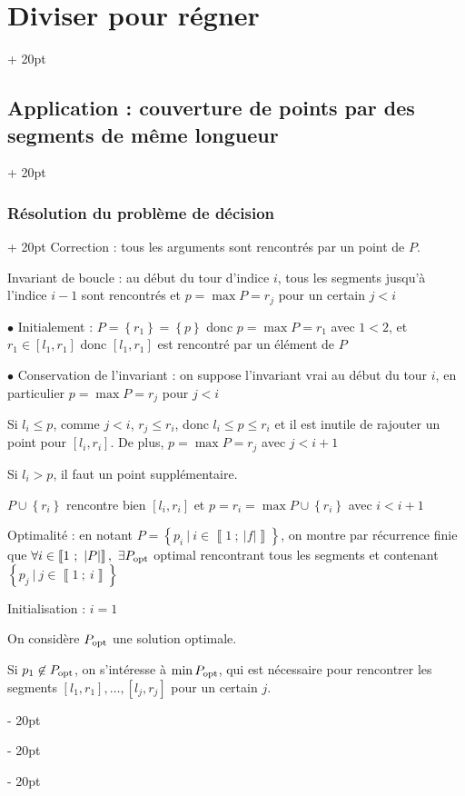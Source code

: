 \documentclass[a4paper, 12pt, twoside]{article}
\newcommand{\nset}[2]{\left\llbracket #1\ ;\ #2 \right\rrbracket}
\newcommand{\set}[1]{\left\{ #1 \right\}}
\newcommand{\abs}[1]{\left\lvert #1 \right\rvert} %
\renewcommand{\le}{\leqslant}
\newcommand{\ind}[1][20pt]{\advance\leftskip + #1}
\newcommand{\deind}[1][20pt]{\advance\leftskip - #1}
\newenvironment{indt}[2][20pt]{#2 \par \ind[#1]}{\par \deind} %
\begin{document}
\begin{indt}{\section{Diviser pour régner}}
\begin{indt}{\subsection{Application : couverture de points par des segments de même longueur}}
\begin{indt}{\subsubsection{Résolution du problème de décision}}
                Correction : tous les arguments sont rencontrés par un point de $P$.
                
                Invariant de boucle : au début du tour d'indice $i$, tous les segments jusqu'à l'indice $i - 1$ sont rencontrés et $p = \max P = r_j$ pour un certain $j < i$
                
                \vspace{12pt}
                
                $\bullet$ Initialement : $P = \set{r_1} = \set p$ donc $p = \max P = r_1$ avec $1 < 2$, et $r_1 \in [l_1, r_1]$ donc $[l_1, r_1]$ est rencontré par un élément de $P$
                
                \vspace{6pt}
                
                $\bullet$ Conservation de l'invariant : on suppose l'invariant vrai au début du tour $i$, en particulier $p = \max P = r_j$ pour $j < i$
                
                Si $l_i \le p$, comme $j < i$, $r_j \le r_i$, donc $l_i \le p \le r_i$ et il est inutile de rajouter un point pour $[l_i, r_i]$. De plus, $p = \max P = r_j$ avec $j < i + 1$
                
                Si $l_i > p$, il faut un point supplémentaire.
                
                $P \cup \set{r_i}$ rencontre bien $[l_i, r_i]$ et $p = r_i = \max P \cup \set{r_i}$ avec $i < i + 1$
                
                \vspace{12pt}
                
                Optimalité : en notant $P = \set{p_i\ |\ i \in \nset{1}{\abs f}}$, on montre par récurrence finie que $\forall i \in \nset{1}{\abs P},\ \exists P_{\rm opt}$ optimal rencontrant tous les segments et contenant $\set{p_j\ |\ j \in \nset 1 i}$
                
                \vspace{6pt}
                
                Initialisation : $i = 1$
                
                On considère $P_{\rm opt}$ une solution optimale.
                
                Si $p_1 \not \in P_{\rm opt}$, on s'intéresse à $\min P_{\rm opt}$, qui est nécessaire pour rencontrer les segments $[l_1, r_1], \ldots, [l_j, r_j]$ pour un certain $j$.
                

\end{indt}
\end{indt}
\end{indt}
\end{document}
